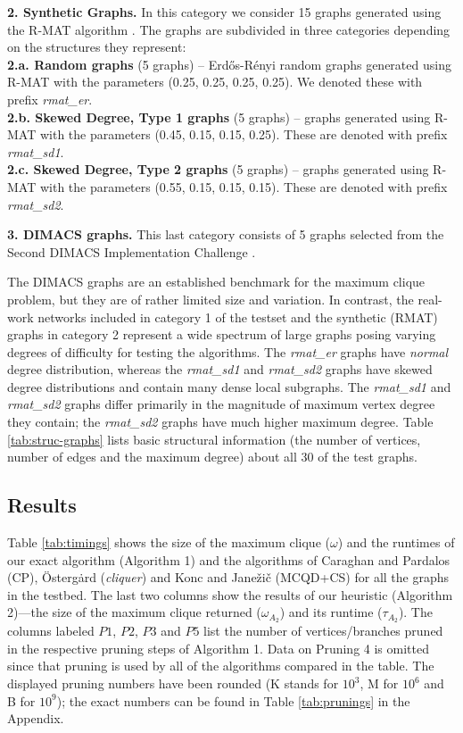{\bf 2. Synthetic Graphs. } 
In this category we consider 15 graphs generated using 
the R-MAT algorithm \cite{Chakrabarti:2006:GML:1132952.1132954}. The graphs
are subdivided in three categories depending on the structures they represent:\\
{\bf 2.a. Random graphs} (5 graphs) -- Erd\H{o}s-R\'{e}nyi random  graphs generated using R-MAT 
with the parameters (0.25, 0.25, 0.25, 0.25).  We denoted these with prefix {\it rmat\_er}.\\
{\bf 2.b. Skewed Degree, Type 1 graphs} (5 graphs) -- graphs generated using R-MAT with the parameters (0.45, 0.15, 0.15, 0.25). These are denoted with prefix {\it rmat\_sd1}.\\
{\bf 2.c. Skewed Degree, Type 2 graphs} (5 graphs) --  graphs generated using R-MAT with the parameters (0.55, 0.15, 0.15, 0.15). These are denoted with prefix {\it rmat\_sd2}.


{\bf 3. DIMACS graphs. } 
This last category consists of 5 graphs selected from the Second DIMACS Implementation Challenge \cite{dimacs}. 

The DIMACS graphs  are an established benchmark for the maximum
clique problem, but they are of rather limited size and variation. 
In contrast, the real-work networks included  in category 1 of the testset
and the synthetic (RMAT) graphs in category 2
represent a wide spectrum of large graphs posing varying degrees of difficulty for testing the algorithms. 
The {\it rmat\_er} graphs have {\it normal} degree distribution, whereas the {\it rmat\_sd1} and {\it rmat\_sd2} graphs have skewed degree distributions and contain many dense local subgraphs.
 The {\it rmat\_sd1} and {\it rmat\_sd2} graphs differ primarily in the magnitude of maximum vertex degree they contain; the {\it rmat\_sd2} graphs have much higher maximum degree. 
Table \ref{tab:struc-graphs} lists basic structural information (the number of vertices, 
number of edges and the maximum degree) about all 30 of the test graphs.



\subsection{Results}
\label{sec:exp-results}



Table \ref{tab:timings} shows the size of the maximum clique ($\omega$) and the runtimes  of our exact algorithm (Algorithm 1) and the algorithms of Caraghan and Pardalos (CP), 
\"{O}sterg\.{a}rd ({\it cliquer}) 
and Konc and Jane\v{z}i\v{c}  (MCQD+CS) for all the graphs in the testbed. 
The last two columns show the results of our heuristic (Algorithm 2)---the size of the maximum clique 
returned ($\omega_{A_2}$)  and its runtime ($\tau_{A_2}$). 
The columns labeled $P1$, $P2$, $P3$ and $P5$ list the number of 
vertices/branches pruned in the respective pruning steps of Algorithm 1.
Data on Pruning 4 is omitted since that pruning is used by all of the algorithms compared in the table. The displayed pruning numbers have been rounded  (K stands for $10^3$, M for $10^6$ and B for $10^9$);
the exact numbers can be found in Table \ref{tab:prunings} in the Appendix.


